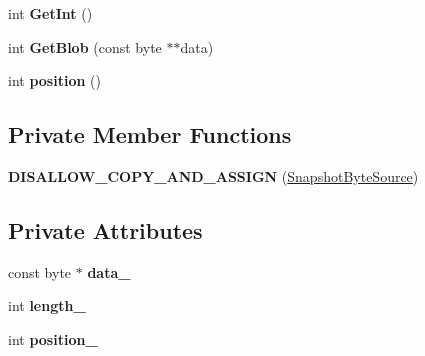 \begin{DoxyCompactItemize}
\item 
int {\bfseries Get\+Int} ()\hypertarget{classv8_1_1internal_1_1_snapshot_byte_source_ad5cb3ae81d5d7b7472275810f00b5909}{}\label{classv8_1_1internal_1_1_snapshot_byte_source_ad5cb3ae81d5d7b7472275810f00b5909}

\item 
int {\bfseries Get\+Blob} (const byte $\ast$$\ast$data)\hypertarget{classv8_1_1internal_1_1_snapshot_byte_source_a0d703872a07e2b59582be56138c35728}{}\label{classv8_1_1internal_1_1_snapshot_byte_source_a0d703872a07e2b59582be56138c35728}

\item 
int {\bfseries position} ()\hypertarget{classv8_1_1internal_1_1_snapshot_byte_source_a6f196210f0bf57cae0c66ca659e7a130}{}\label{classv8_1_1internal_1_1_snapshot_byte_source_a6f196210f0bf57cae0c66ca659e7a130}

\end{DoxyCompactItemize}
\subsection*{Private Member Functions}
\begin{DoxyCompactItemize}
\item 
{\bfseries D\+I\+S\+A\+L\+L\+O\+W\+\_\+\+C\+O\+P\+Y\+\_\+\+A\+N\+D\+\_\+\+A\+S\+S\+I\+GN} (\hyperlink{classv8_1_1internal_1_1_snapshot_byte_source}{Snapshot\+Byte\+Source})\hypertarget{classv8_1_1internal_1_1_snapshot_byte_source_a19beaee7a0a52e4055e3cbfd84380b67}{}\label{classv8_1_1internal_1_1_snapshot_byte_source_a19beaee7a0a52e4055e3cbfd84380b67}

\end{DoxyCompactItemize}
\subsection*{Private Attributes}
\begin{DoxyCompactItemize}
\item 
const byte $\ast$ {\bfseries data\+\_\+}\hypertarget{classv8_1_1internal_1_1_snapshot_byte_source_afb439006ea3a765eaee32a9f34b842e3}{}\label{classv8_1_1internal_1_1_snapshot_byte_source_afb439006ea3a765eaee32a9f34b842e3}

\item 
int {\bfseries length\+\_\+}\hypertarget{classv8_1_1internal_1_1_snapshot_byte_source_ac281b199b9c74eab38f68b053907a902}{}\label{classv8_1_1internal_1_1_snapshot_byte_source_ac281b199b9c74eab38f68b053907a902}

\item 
int {\bfseries position\+\_\+}\hypertarget{classv8_1_1internal_1_1_snapshot_byte_source_ae1f782248415ee4baf56cfe152deda64}{}\label{classv8_1_1internal_1_1_snapshot_byte_source_ae1f782248415ee4baf56cfe152deda64}

\end{DoxyCompactItemize}


